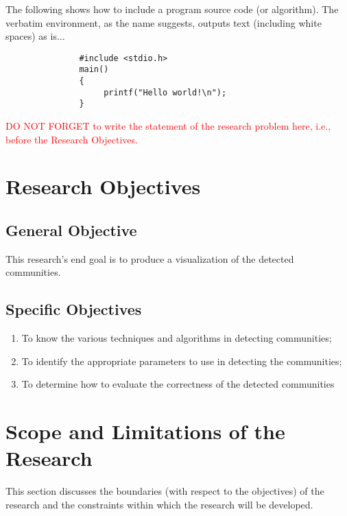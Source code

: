 The following shows how to include a program source code (or algorithm).  The verbatim environment,
as the name suggests, outputs text (including white spaces) as is...

\begin{verbatim}
               #include <stdio.h>
               main()
               {
                    printf("Hello world!\n");
               }
\end{verbatim}


\textcolor{red}{DO NOT FORGET to write the statement of the research problem here, i.e.,
before the Research Objectives.}



\section{Research Objectives}
\label{sec:researchobjectives}

\subsection{General Objective}
\label{sec:generalobjective}

This research's end goal is to produce a visualization of the detected communities.


\subsection{Specific Objectives}
\label{sec:specificobjectives}

\begin{enumerate}
	\item To know the various techniques and algorithms in detecting communities;
	\item To identify the appropriate parameters to use in detecting the communities;
	\item To determine how to evaluate the correctness of the detected communities
\end{enumerate}

\section{Scope and Limitations of the Research}
\label{sec:scopelimitations}

This section discusses the boundaries (with respect to the objectives) of the research and the constraints within 
which the research will be developed.

